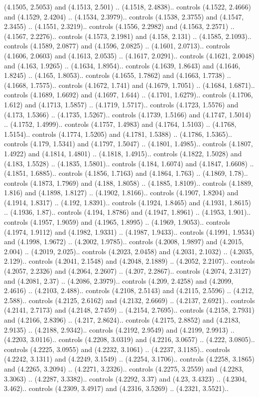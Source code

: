 (4.1505, 2.5053) and (4.1513, 2.501) .. (4.1518, 2.4838).. controls (4.1522, 2.4666) and (4.1529, 2.4204) .. (4.1534, 2.3979).. controls (4.1538, 2.3755) and (4.1547, 2.3455) .. (4.1551, 2.3219).. controls (4.1556, 2.2982) and (4.1563, 2.2571) .. (4.1567, 2.2276).. controls (4.1573, 2.1981) and (4.158, 2.131) .. (4.1585, 2.1093).. controls (4.1589, 2.0877) and (4.1596, 2.0825) .. (4.1601, 2.0713).. controls (4.1606, 2.0603) and (4.1613, 2.0535) .. (4.1617, 2.0291).. controls (4.1621, 2.0048) and (4.163, 1.9265) .. (4.1634, 1.8954).. controls (4.1639, 1.8643) and (4.1646, 1.8245) .. (4.165, 1.8053).. controls (4.1655, 1.7862) and (4.1663, 1.7738) .. (4.1668, 1.7575).. controls (4.1672, 1.741) and (4.1679, 1.7051) .. (4.1684, 1.6871).. controls (4.1689, 1.6692) and (4.1697, 1.644) .. (4.1701, 1.6279).. controls (4.1706, 1.612) and (4.1713, 1.5857) .. (4.1719, 1.5717).. controls (4.1723, 1.5576) and (4.173, 1.5366) .. (4.1735, 1.5267).. controls (4.1739, 1.5166) and (4.1747, 1.5014) .. (4.1752, 1.4999).. controls (4.1757, 1.4983) and (4.1764, 1.5103) .. (4.1768, 1.5154).. controls (4.1774, 1.5205) and (4.1781, 1.5388) .. (4.1786, 1.5365).. controls (4.179, 1.5341) and (4.1797, 1.5047) .. (4.1801, 1.4985).. controls (4.1807, 1.4922) and (4.1814, 1.4801) .. (4.1818, 1.4915).. controls (4.1822, 1.5028) and (4.183, 1.5528) .. (4.1835, 1.5801).. controls (4.184, 1.6074) and (4.1847, 1.6608) .. (4.1851, 1.6885).. controls (4.1856, 1.7163) and (4.1864, 1.763) .. (4.1869, 1.78).. controls (4.1873, 1.7969) and (4.188, 1.8058) .. (4.1885, 1.8109).. controls (4.1889, 1.816) and (4.1898, 1.8127) .. (4.1902, 1.8166).. controls (4.1907, 1.8204) and (4.1914, 1.8317) .. (4.192, 1.8391).. controls (4.1924, 1.8465) and (4.1931, 1.8615) .. (4.1936, 1.87).. controls (4.194, 1.8786) and (4.1947, 1.8961) .. (4.1953, 1.901).. controls (4.1957, 1.9059) and (4.1965, 1.8995) .. (4.1969, 1.9053).. controls (4.1974, 1.9112) and (4.1982, 1.9331) .. (4.1987, 1.9433).. controls (4.1991, 1.9534) and (4.1998, 1.9672) .. (4.2002, 1.9785).. controls (4.2008, 1.9897) and (4.2015, 2.004) .. (4.2019, 2.025).. controls (4.2023, 2.0458) and (4.2031, 2.1032) .. (4.2035, 2.129).. controls (4.2041, 2.1548) and (4.2048, 2.1889) .. (4.2052, 2.2107).. controls (4.2057, 2.2326) and (4.2064, 2.2607) .. (4.207, 2.2867).. controls (4.2074, 2.3127) and (4.2081, 2.37) .. (4.2086, 2.3979).. controls (4.209, 2.4258) and (4.2099, 2.4616) .. (4.2103, 2.488).. controls (4.2108, 2.5143) and (4.2115, 2.5596) .. (4.212, 2.588).. controls (4.2125, 2.6162) and (4.2132, 2.6669) .. (4.2137, 2.6921).. controls (4.2141, 2.7173) and (4.2148, 2.7459) .. (4.2154, 2.7695).. controls (4.2158, 2.7931) and (4.2166, 2.8396) .. (4.217, 2.8624).. controls (4.2175, 2.8852) and (4.2183, 2.9135) .. (4.2188, 2.9342).. controls (4.2192, 2.9549) and (4.2199, 2.9913) .. (4.2203, 3.0116).. controls (4.2208, 3.0319) and (4.2216, 3.0657) .. (4.222, 3.0805).. controls (4.2225, 3.0955) and (4.2232, 3.1061) .. (4.2237, 3.1185).. controls (4.2242, 3.1311) and (4.2249, 3.1549) .. (4.2254, 3.1706).. controls (4.2258, 3.1865) and (4.2265, 3.2094) .. (4.2271, 3.2326).. controls (4.2275, 3.2559) and (4.2283, 3.3063) .. (4.2287, 3.3382).. controls (4.2292, 3.37) and (4.23, 3.4323) .. (4.2304, 3.462).. controls (4.2309, 3.4917) and (4.2316, 3.5269) .. (4.2321, 3.5521).. 